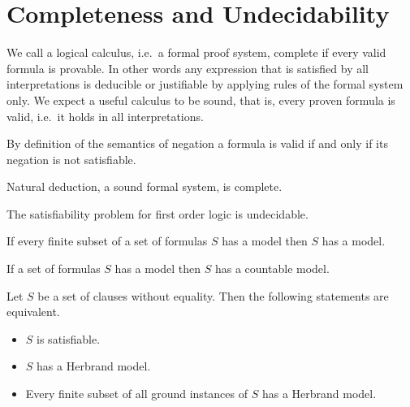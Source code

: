 

\chapter{Completeness and Undecidability}

	We call a logical calculus, i.e.~a formal proof system, {\myem complete} if every valid formula is provable.
	In other words any expression that is satisfied by all interpretations 
	is deducible or justifiable by applying rules of the formal system only.
	We expect a useful calculus to be {\myem sound}, that is, every proven formula is valid, 
	i.e.~it holds in all interpretations.

\begin{lemma}[Refutation]
	By definition of the semantics of negation a formula is valid if and only if its negation is not satisfiable.
\end{lemma}

\begin{theorem}
	Natural deduction, a sound formal system, is complete.
\end{theorem}

\begin{theorem}
	The satisfiability problem for first order logic is undecidable.
\end{theorem}

\begin{theorem}
\end{theorem}








\begin{theorem}[Compactness]\label{the:compactness}
	If every finite subset of a set of formulas $S$ has a model then $S$ has a model. 
\end{theorem}

\begin{theorem}\label{the:loewenheim}
	If a set of formulas $S$ has a model then $S$ has a countable model.
\end{theorem}

\begin{theorem}[Herbrand]\label{the:herbrand}
	Let $S$ be a set of clauses without equality. Then the following statements are equivalent.
	\begin{itemize}
		\item $S$ is satisfiable.
		\item $S$ has a Herbrand model.
		\item Every finite subset of all ground instances of $S$ has a Herbrand model.
	\end{itemize} 
\end{theorem}

